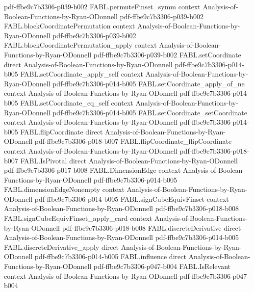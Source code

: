 \begin{theorem}
  {pdf-ffbe9c7b3306-p039-b002}
\proofstep
  {FABL.permuteFinset_symm}
  {context}
  {Analysis-of-Boolean-Functions-by-Ryan-ODonnell}
  {pdf-ffbe9c7b3306-p039-b002}
\proofstep
  {FABL.blockCoordinatePermutation}
  {context}
  {Analysis-of-Boolean-Functions-by-Ryan-ODonnell}
  {pdf-ffbe9c7b3306-p039-b002}
\proofstep
  {FABL.blockCoordinatePermutation_apply}
  {context}
  {Analysis-of-Boolean-Functions-by-Ryan-ODonnell}
  {pdf-ffbe9c7b3306-p039-b002}
\proofstep
  {FABL.setCoordinate}
  {direct}
  {Analysis-of-Boolean-Functions-by-Ryan-ODonnell}
  {pdf-ffbe9c7b3306-p014-b005}
\proofstep
  {FABL.setCoordinate_apply_self}
  {context}
  {Analysis-of-Boolean-Functions-by-Ryan-ODonnell}
  {pdf-ffbe9c7b3306-p014-b005}
\proofstep
  {FABL.setCoordinate_apply_of_ne}
  {context}
  {Analysis-of-Boolean-Functions-by-Ryan-ODonnell}
  {pdf-ffbe9c7b3306-p014-b005}
\proofstep
  {FABL.setCoordinate_eq_self}
  {context}
  {Analysis-of-Boolean-Functions-by-Ryan-ODonnell}
  {pdf-ffbe9c7b3306-p014-b005}
\proofstep
  {FABL.setCoordinate_setCoordinate}
  {context}
  {Analysis-of-Boolean-Functions-by-Ryan-ODonnell}
  {pdf-ffbe9c7b3306-p014-b005}
\proofstep
  {FABL.flipCoordinate}
  {direct}
  {Analysis-of-Boolean-Functions-by-Ryan-ODonnell}
  {pdf-ffbe9c7b3306-p018-b007}
\proofstep
  {FABL.flipCoordinate_flipCoordinate}
  {context}
  {Analysis-of-Boolean-Functions-by-Ryan-ODonnell}
  {pdf-ffbe9c7b3306-p018-b007}
\proofstep
  {FABL.IsPivotal}
  {direct}
  {Analysis-of-Boolean-Functions-by-Ryan-ODonnell}
  {pdf-ffbe9c7b3306-p017-b008}
\proofstep
  {FABL.DimensionEdge}
  {context}
  {Analysis-of-Boolean-Functions-by-Ryan-ODonnell}
  {pdf-ffbe9c7b3306-p014-b005}
\proofstep
  {FABL.dimensionEdgeNonempty}
  {context}
  {Analysis-of-Boolean-Functions-by-Ryan-ODonnell}
  {pdf-ffbe9c7b3306-p014-b005}
\proofstep
  {FABL.signCubeEquivFinset}
  {context}
  {Analysis-of-Boolean-Functions-by-Ryan-ODonnell}
  {pdf-ffbe9c7b3306-p018-b008}
\proofstep
  {FABL.signCubeEquivFinset_apply_card}
  {context}
  {Analysis-of-Boolean-Functions-by-Ryan-ODonnell}
  {pdf-ffbe9c7b3306-p018-b008}
\proofstep
  {FABL.discreteDerivative}
  {direct}
  {Analysis-of-Boolean-Functions-by-Ryan-ODonnell}
  {pdf-ffbe9c7b3306-p014-b005}
\proofstep
  {FABL.discreteDerivative_apply}
  {direct}
  {Analysis-of-Boolean-Functions-by-Ryan-ODonnell}
  {pdf-ffbe9c7b3306-p014-b005}
\proofstep
  {FABL.influence}
  {direct}
  {Analysis-of-Boolean-Functions-by-Ryan-ODonnell}
  {pdf-ffbe9c7b3306-p047-b004}
\proofstep
  {FABL.IsRelevant}
  {context}
  {Analysis-of-Boolean-Functions-by-Ryan-ODonnell}
  {pdf-ffbe9c7b3306-p047-b004}
\proofstep

\end{theorem}

